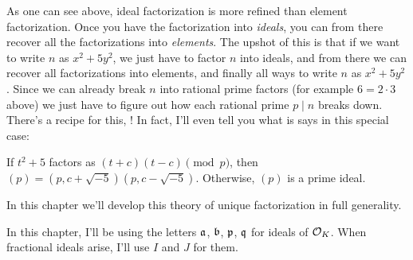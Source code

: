 As one can see above,
ideal factorization is more refined than element factorization.
Once you have the factorization into \emph{ideals},
you can from there recover all the factorizations into \emph{elements}.
The upshot of this is that if we want to write $n$ as $x^2+5y^2$,
we just have to factor $n$ into ideals,
and from there we can recover all factorizations into elements,
and finally all ways to write $n$ as $x^2+5y^2$.
Since we can already break $n$ into rational prime factors
(for example $6 = 2 \cdot 3$ above)
we just have to figure out how each rational prime $p \mid n$ breaks down.
There's a recipe for this, !
In fact, I'll even tell you what is says in this special case:
\begin{itemize}
	\ii If $t^2+5$ factors as $(t+c)(t-c) \pmod p$,
	then $(p) = (p, c+\sqrt{-5})(p, c-\sqrt{-5})$.
	\ii Otherwise, $(p)$ is a prime ideal.
\end{itemize}
In this chapter we'll develop this theory of unique factorization in full generality.


\begin{remark}
	In this chapter, I'll be using the letters $\mathfrak a$, $\mathfrak b$, $\mathfrak p$, $\mathfrak q$
	for ideals of $\mathcal O_K$.
	When fractional ideals arise, I'll use $I$ and $J$ for them.
\end{remark}

